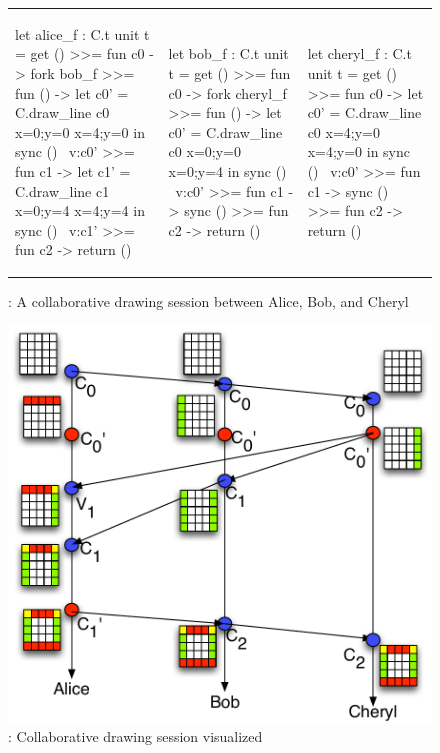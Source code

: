 \begin{figure}
\centering
\begin{tabular}{l||l||l}
\begin{ocaml}
let alice_f : C.t unit t = 
  get () >>= fun c0 -> 
  fork bob_f >>= fun () ->
  let c0' = C.draw_line c0 
    {x=0;y=0}
    {x=4;y=0} in
  sync () ~v:c0' >>= 
  fun c1 ->
  let c1' = C.draw_line c1 
    {x=0;y=4} 
    {x=4;y=4} in
  sync () ~v:c1' >>= 
  fun c2 -> return ()
\end{ocaml}
&
\begin{ocaml}
let bob_f : C.t unit t = 
  get () >>= fun c0 -> 
  fork cheryl_f >>= 
  fun () ->
  let c0' = C.draw_line c0 
    {x=0;y=0} 
    {x=0;y=4} in
  sync () ~v:c0' >>= 
  fun c1 -> sync () >>= 
  fun c2 -> return ()
\end{ocaml}
&
\begin{ocaml}
let cheryl_f : C.t unit t = 
  get () >>= fun c0 -> 
  let c0' = C.draw_line c0 
    {x=4;y=0} 
    {x=4;y=0} in
  sync () ~v:c0' >>= 
  fun c1 -> sync () >>= 
  fun c2 -> return ()
\end{ocaml}
\\
\end{tabular}
\caption{\drawsome: A collaborative drawing session between Alice,
Bob, and Cheryl}
\label{fig:canvas-sessions-code}
\end{figure}

\begin{figure}
\centering
\includegraphics[scale=0.6]{Figures/canvas-sessions}

\caption{\drawsome: Collaborative drawing session visualized}
\label{fig:canvas-sessions}
\end{figure}

